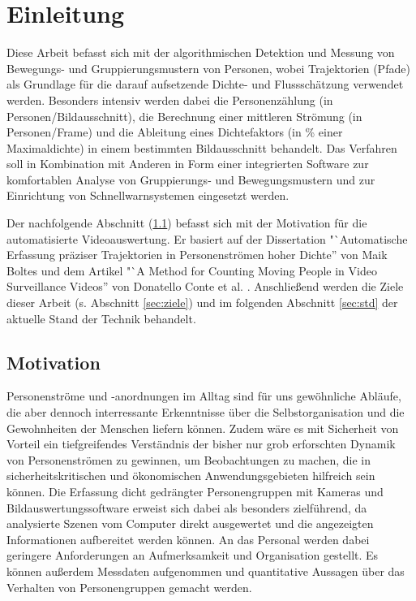 \chapter{Einleitung}
\label{chap:ein}

Diese Arbeit befasst sich mit der algorithmischen Detektion und Messung von Bewegungs- und Gruppierungsmustern von Personen, wobei Trajektorien (Pfade) als Grundlage für die darauf aufsetzende Dichte- und Flussschätzung verwendet werden. Besonders intensiv werden dabei die Personenzählung (in Personen/Bildausschnitt), die Berechnung einer mittleren Strömung (in Personen/Frame) und die Ableitung eines Dichtefaktors (in \% einer Maximaldichte) in einem bestimmten Bildausschnitt behandelt. Das Verfahren soll in Kombination mit Anderen in Form einer integrierten Software zur komfortablen Analyse von Gruppierungs- und Bewegungsmustern und zur Einrichtung von Schnellwarnsystemen eingesetzt werden.

Der nachfolgende Abschnitt (\ref{sec:motiv}) befasst sich mit der Motivation für die automatisierte Videoauswertung. Er basiert auf der Dissertation "`Automatische Erfassung präziser Trajektorien in Personenströmen hoher Dichte'' von Maik Boltes \cite{boltes} und dem Artikel "`A Method for Counting Moving People in Video Surveillance Videos'' von Donatello Conte et al. \cite{conte}. Anschließend werden die Ziele dieser Arbeit (s. Abschnitt \ref{sec:ziele}) und im folgenden Abschnitt \ref{sec:std} der aktuelle Stand der Technik behandelt.

\section{Motivation}
\label{sec:motiv}

Personenströme und -anordnungen im Alltag sind für uns gewöhnliche Abläufe, die aber dennoch interressante Erkenntnisse über die Selbstorganisation und die Gewohnheiten der Menschen liefern können. Zudem wäre es mit Sicherheit von Vorteil ein tiefgreifendes Verständnis der bisher nur grob erforschten Dynamik von Personenströmen zu gewinnen, um Beobachtungen zu machen, die in sicherheitskritischen und ökonomischen Anwendungsgebieten hilfreich sein können. 
\newpage
Die Erfassung dicht gedrängter Personengruppen mit Kameras und Bildauswertungssoftware erweist sich dabei als besonders zielführend, da analysierte Szenen vom Computer direkt ausgewertet und die angezeigten Informationen aufbereitet werden können. An das Personal werden dabei geringere Anforderungen an Aufmerksamkeit und Organisation gestellt. Es können außerdem Messdaten aufgenommen und quantitative Aussagen über das Verhalten von Personengruppen gemacht werden.

